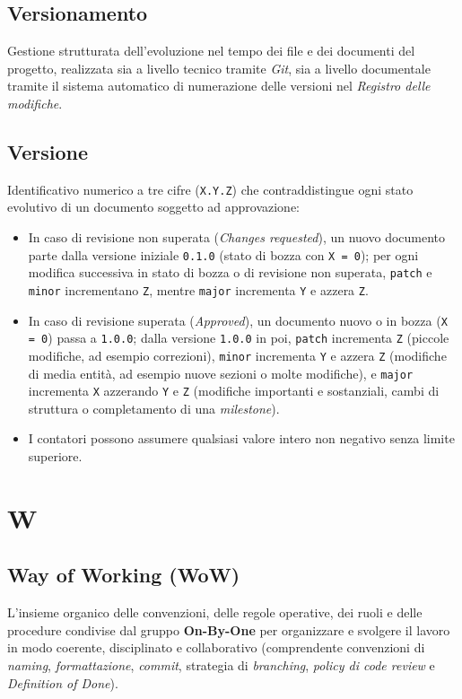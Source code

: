 \documentclass[11pt, a4paper]{article}
\begin{document}
\subsection*{Versionamento}
Gestione strutturata dell'evoluzione nel tempo dei file e dei documenti del progetto, realizzata sia a livello tecnico tramite \textit{Git}, sia a livello documentale tramite il sistema automatico di numerazione delle versioni nel \textit{Registro delle modifiche}.

\subsection*{Versione}
Identificativo numerico a tre cifre (\texttt{X.Y.Z}) che contraddistingue ogni stato evolutivo di un documento soggetto ad approvazione:
\begin{itemize}
    \item In caso di revisione non superata (\textit{Changes requested}), un nuovo documento parte dalla versione iniziale \texttt{0.1.0} (stato di bozza con \texttt{X = 0}); per ogni modifica successiva in stato di bozza o di revisione non superata, \texttt{patch} e \texttt{minor} incrementano \texttt{Z}, mentre \texttt{major} incrementa \texttt{Y} e azzera \texttt{Z}.
    \item In caso di revisione superata (\textit{Approved}), un documento nuovo o in bozza (\texttt{X = 0}) passa a \texttt{1.0.0}; dalla versione \texttt{1.0.0} in poi, \texttt{patch} incrementa \texttt{Z} (piccole modifiche, ad esempio correzioni), \texttt{minor} incrementa \texttt{Y} e azzera \texttt{Z} (modifiche di media entità, ad esempio nuove sezioni o molte modifiche), e \texttt{major} incrementa \texttt{X} azzerando \texttt{Y} e \texttt{Z} (modifiche importanti e sostanziali, cambi di struttura o completamento di una \textit{milestone}).
    \item I contatori possono assumere qualsiasi valore intero non negativo senza limite superiore.
\end{itemize}

\newpage

\section*{W}

\subsection*{Way of Working (WoW)}
L'insieme organico delle convenzioni, delle regole operative, dei ruoli e delle procedure condivise dal gruppo \textbf{On-By-One} per organizzare e svolgere il lavoro in modo coerente, disciplinato e collaborativo (comprendente convenzioni di \textit{naming}, \textit{formattazione}, \textit{commit}, strategia di \textit{branching}, \textit{policy di code review} e \textit{Definition of Done}).
\end{document}
